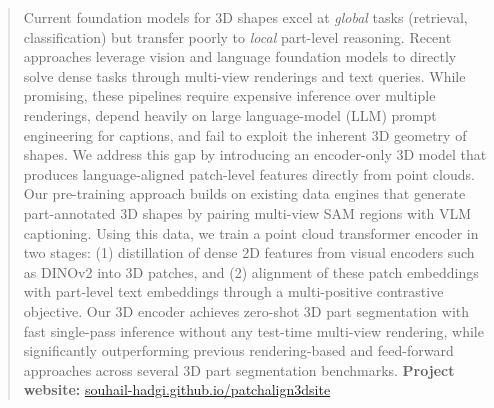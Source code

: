 \begin{abstract}
Current foundation models for 3D shapes excel at \emph{global} tasks (retrieval, classification) but transfer poorly to \emph{local} part-level reasoning. Recent approaches leverage vision and language foundation models to directly solve dense tasks through multi-view renderings and text queries. While promising, these pipelines require expensive inference over multiple renderings, depend heavily on large language-model (LLM) prompt engineering for captions, and fail to exploit the inherent 3D geometry of shapes. We address this gap by introducing an encoder-only 3D model that produces language-aligned patch-level features directly from point clouds. Our pre-training approach builds on existing data engines that generate part-annotated 3D shapes by pairing multi-view SAM regions with VLM captioning. Using this data, we train a point cloud transformer encoder in two stages: (1) distillation of dense 2D features from visual encoders such as DINOv2 into 3D patches, and (2) alignment of these patch embeddings with part-level text embeddings through a multi-positive contrastive objective. Our 3D encoder achieves zero-shot 3D part segmentation with fast single-pass inference without any test-time multi-view rendering, while significantly outperforming previous rendering-based and feed-forward approaches across several 3D part segmentation benchmarks. \noindent\textbf{Project website:} \href{https://souhail-hadgi.github.io/patchalign3dsite}{souhail-hadgi.github.io/patchalign3dsite}

\end{abstract}